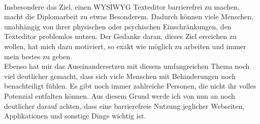 \mbox{}\\
Insbesondere das Ziel, einen WYSIWYG Texteditor barrierefrei zu machen, macht die Diplomarbeit zu etwas Besonderem. Dadurch können viele Menschen, unabhängig von ihrer physischen oder psychischen Einschränkungen, den Texteditor problemlos nutzen. Der Gedanke daran, dieses Ziel erreichen zu wollen, hat mich dazu motiviert, so exakt wie möglich zu arbeiten und immer mein bestes zu geben.\\
Ebenso hat mir das Auseinandersetzen mit diesem umfangreichen Thema noch viel deutlicher gemacht, dass sich viele Menschen mit Behinderungen noch benachteiligt fühlen. Es gibt noch immer zahlreiche Personen, die nicht ihr volles Potenzial entfalten können. Aus diesem Grund werde ich von nun an noch deutlicher darauf achten, dass eine barrierefreie Nutzung jeglicher Webseiten, Applikationen und sonstige Dinge wichtig ist.